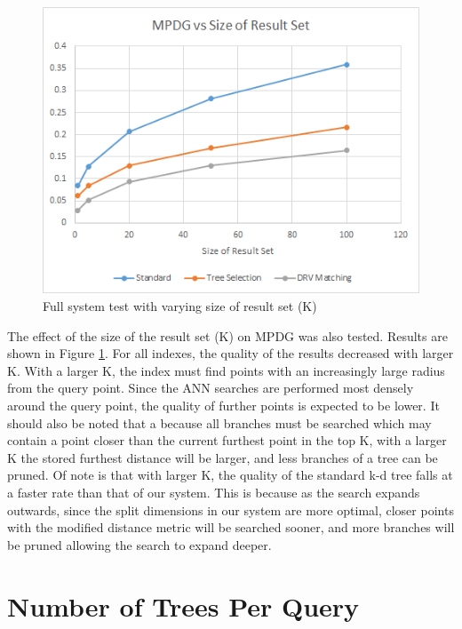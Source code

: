 \begin{figure}[h]
\begin{center}
\includegraphics[width=.85\textwidth]{Figures/k}
\end{center}
\caption{Full system test with varying size of result set (K)}
\label{fig:kparam}
\end{figure}

The effect of the size of the result set (K) on MPDG was also tested.  Results are shown in Figure \ref{fig:kparam}.  For all indexes, the quality of the results decreased with larger K.  With a larger K, the index must find points with an increasingly large radius from the query point.  Since the ANN searches are performed most densely around the query point, the quality of further points is expected to be lower.  It should also be noted that a because all branches must be searched which may contain a point closer than the current furthest point in the top K, with a larger K the stored furthest distance will be larger, and less branches of a tree can be pruned.  Of note is that with larger K, the quality of the standard k-d tree falls at a faster rate than that of our system.  This is because as the search expands outwards, since the split dimensions in our system are more optimal, closer points with the modified distance metric will be searched sooner, and more branches will be pruned allowing the search to expand deeper.

\section{Number of Trees Per Query}


